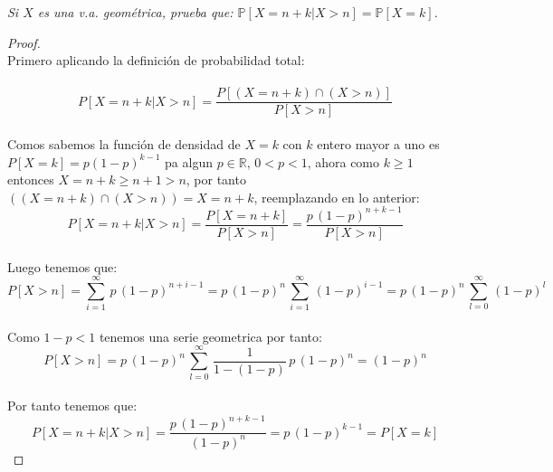\documentclass[11pt,letterpaper]{article}
\newcommand{\R}{\mathbb{R}}
\begin{document}
\begin{tcolorbox}[ 
	title = \textcolor{black}{\textcolor{white}{Problema 8}},]
\textit{Si $X$ es una v.a. geom\'etrica, prueba que:
$\mathbb{P}[X=n+k|X>n]=\mathbb{P}[X=k].$
}
\end{tcolorbox}
\begin{proof}\,\\
  Primero aplicando la definici\'on de probabilidad total:\,\\
  \,\\
  \begin{equation*}
    P[X=n+k|X>n]=\frac{P[(X=n+k)\cap (X>n)]}{P[X>n]}
  \end{equation*}\,\\
  Comos sabemos la funci\'on de densidad de $X=k$ con $k$ entero mayor a uno es $P[X=k]=p(1-p)^{k-1}$ pa algun $p\in \R$, $0<p<1$, ahora como
  $k\geq 1$ entonces $X=n+k\geq n+1>n$, por tanto $((X=n+k)\cap (X>n))=X=n+k$, reemplazando en lo anterior:\,\\
  \begin{equation*}
    P[X=n+k|X>n]=\frac{P[X=n+k]}{P[X>n]}=\frac{p\,(1-p)^{n+k-1}}{P[X>n]}
  \end{equation*}\,\\
  Luego tenemos que:\,\\
  \begin{equation*}
    P[X>n]=\sum_{i=1}^{\infty}\,p\,(1-p)^{n+i-1}=p\,(1-p)^{n}\,\sum_{i=1}^{\infty}\,(1-p)^{i-1}=p\,(1-p)^{n}\,\sum_{l=0}^{\infty}\,(1-p)^{l}
  \end{equation*}\,\\
  Como $1-p<1$ tenemos una serie geometrica por tanto:\,\\
  \begin{equation*}
    P[X>n]=p\,(1-p)^{n}\,\sum_{l=0}^{\infty}\,\frac{1}{1-(1-p)}\,p\,(1-p)^n=(1-p)^n
  \end{equation*}\,\\
  Por tanto tenemos que:\,\\
  \begin{equation*}
     P[X=n+k|X>n]=\frac{p\,(1-p)^{n+k-1}}{(1-p)^n}=p\,(1-p)^{k-1}=P[X=k]
  \end{equation*}
\end{proof}
\end{document}
